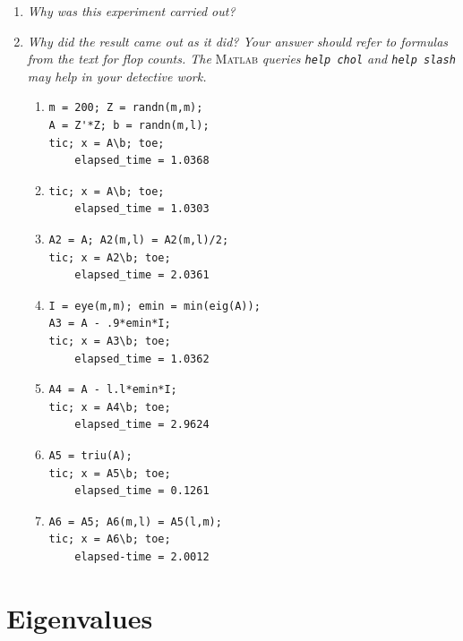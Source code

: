 \documentclass[a4paper,oneside]{book}
\numberwithin{equation}{chapter}
\begin{document}
\begin{enumerate}
\item \textit{Why was this experiment carried out?}
\item \textit{Why did the result came out as it did? Your answer should refer to formulas from the text for flop counts. The}\textsc{ Matlab}\textit{ queries \texttt{help chol} and \texttt{help slash} may help in your detective work.}
\begin{enumerate}
\item 
\begin{verbatim}
m = 200; Z = randn(m,m);
A = Z'*Z; b = randn(m,l);
tic; x = A\b; toe;
    elapsed_time = 1.0368
\end{verbatim}
\item 
\begin{verbatim}
tic; x = A\b; toe;
    elapsed_time = 1.0303
\end{verbatim}
\item 
\begin{verbatim}
A2 = A; A2(m,l) = A2(m,l)/2;
tic; x = A2\b; toe;
    elapsed_time = 2.0361
\end{verbatim}
\item 
\begin{verbatim}
I = eye(m,m); emin = min(eig(A));
A3 = A - .9*emin*I;
tic; x = A3\b; toe;
    elapsed_time = 1.0362
\end{verbatim}
\item
\begin{verbatim}
A4 = A - l.l*emin*I;
tic; x = A4\b; toe;
    elapsed_time = 2.9624
\end{verbatim}
\item 
\begin{verbatim}
A5 = triu(A);
tic; x = A5\b; toe;
    elapsed_time = 0.1261
\end{verbatim}
\item  
\begin{verbatim}
A6 = A5; A6(m,l) = A5(l,m);
tic; x = A6\b; toe;
    elapsed-time = 2.0012
\end{verbatim}
\end{enumerate}
\end{enumerate}


\chapter{Eigenvalues}
\end{document}
